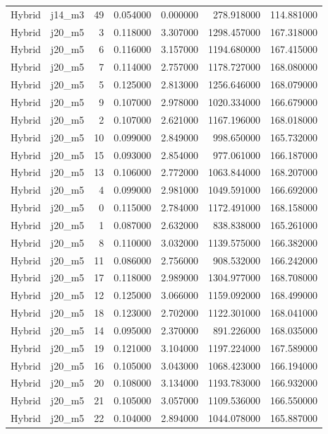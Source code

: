 \begin{tabular}{llrrrrr}
Hybrid & j14_m3 & 49 & 0.054000 & 0.000000 & 278.918000 & 114.881000 \\
Hybrid & j20_m5 & 3 & 0.118000 & 3.307000 & 1298.457000 & 167.318000 \\
Hybrid & j20_m5 & 6 & 0.116000 & 3.157000 & 1194.680000 & 167.415000 \\
Hybrid & j20_m5 & 7 & 0.114000 & 2.757000 & 1178.727000 & 168.080000 \\
Hybrid & j20_m5 & 5 & 0.125000 & 2.813000 & 1256.646000 & 168.079000 \\
Hybrid & j20_m5 & 9 & 0.107000 & 2.978000 & 1020.334000 & 166.679000 \\
Hybrid & j20_m5 & 2 & 0.107000 & 2.621000 & 1167.196000 & 168.018000 \\
Hybrid & j20_m5 & 10 & 0.099000 & 2.849000 & 998.650000 & 165.732000 \\
Hybrid & j20_m5 & 15 & 0.093000 & 2.854000 & 977.061000 & 166.187000 \\
Hybrid & j20_m5 & 13 & 0.106000 & 2.772000 & 1063.844000 & 168.207000 \\
Hybrid & j20_m5 & 4 & 0.099000 & 2.981000 & 1049.591000 & 166.692000 \\
Hybrid & j20_m5 & 0 & 0.115000 & 2.784000 & 1172.491000 & 168.158000 \\
Hybrid & j20_m5 & 1 & 0.087000 & 2.632000 & 838.838000 & 165.261000 \\
Hybrid & j20_m5 & 8 & 0.110000 & 3.032000 & 1139.575000 & 166.382000 \\
Hybrid & j20_m5 & 11 & 0.086000 & 2.756000 & 908.532000 & 166.242000 \\
Hybrid & j20_m5 & 17 & 0.118000 & 2.989000 & 1304.977000 & 168.708000 \\
Hybrid & j20_m5 & 12 & 0.125000 & 3.066000 & 1159.092000 & 168.499000 \\
Hybrid & j20_m5 & 18 & 0.123000 & 2.702000 & 1122.301000 & 168.041000 \\
Hybrid & j20_m5 & 14 & 0.095000 & 2.370000 & 891.226000 & 168.035000 \\
Hybrid & j20_m5 & 19 & 0.121000 & 3.104000 & 1197.224000 & 167.589000 \\
Hybrid & j20_m5 & 16 & 0.105000 & 3.043000 & 1068.423000 & 166.194000 \\
Hybrid & j20_m5 & 20 & 0.108000 & 3.134000 & 1193.783000 & 166.932000 \\
Hybrid & j20_m5 & 21 & 0.105000 & 3.057000 & 1109.536000 & 166.550000 \\
Hybrid & j20_m5 & 22 & 0.104000 & 2.894000 & 1044.078000 & 165.887000 \\

\end{tabular}

